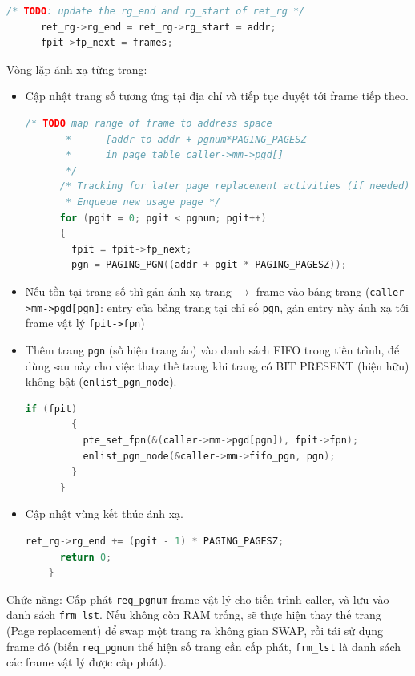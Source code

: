 \begin{lstlisting}[style=Cstyle,language=C]
      /* TODO: update the rg_end and rg_start of ret_rg */
      ret_rg->rg_end = ret_rg->rg_start = addr;
      fpit->fp_next = frames;\end{lstlisting}

Vòng lặp ánh xạ từng trang:

\begin{itemize}
 \item  Cập nhật trang số tương ứng tại địa chỉ và tiếp tục duyệt tới frame tiếp theo.
\begin{lstlisting}[style=Cstyle,language=C]
      /* TODO map range of frame to address space
       *      [addr to addr + pgnum*PAGING_PAGESZ
       *      in page table caller->mm->pgd[]
       */
      /* Tracking for later page replacement activities (if needed)
       * Enqueue new usage page */
      for (pgit = 0; pgit < pgnum; pgit++)
      {
        fpit = fpit->fp_next;
        pgn = PAGING_PGN((addr + pgit * PAGING_PAGESZ));
\end{lstlisting}
 \item Nếu tồn tại trang số thì gán ánh xạ trang $\rightarrow$ frame vào bảng trang (\texttt{caller->mm->pgd[pgn]}: entry của bảng trang tại chỉ số \texttt{pgn}, gán entry này ánh xạ tới frame vật lý \texttt{fpit->fpn})
 \item Thêm trang \texttt{pgn} (số hiệu trang ảo) vào danh sách FIFO trong tiến trình, để dùng sau này cho việc thay thế trang khi trang có BIT PRESENT (hiện hữu) không bật (\texttt{enlist\_pgn\_node}).
 
\begin{lstlisting}[style=Cstyle,language=C]
        if (fpit)
        {
          pte_set_fpn(&(caller->mm->pgd[pgn]), fpit->fpn);
          enlist_pgn_node(&caller->mm->fifo_pgn, pgn);
        }
      }
\end{lstlisting} 
\item Cập nhật vùng kết thúc ánh xạ.
\begin{lstlisting}[style=Cstyle,language=C]    
      ret_rg->rg_end += (pgit - 1) * PAGING_PAGESZ;
      return 0;
    }
\end{lstlisting} 
\end{itemize}
    
Chức năng: Cấp phát \texttt{req\_pgnum} frame vật lý cho tiến trình caller, và lưu vào danh sách \texttt{frm\_lst}. Nếu không còn RAM trống, sẽ thực hiện thay thế trang (Page replacement) để swap một trang ra không gian SWAP, rồi tái sử dụng frame đó (biến \texttt{req\_pgnum} thể hiện số trang cần cấp phát, \texttt{frm\_lst} là danh sách các frame vật lý được cấp phát).


